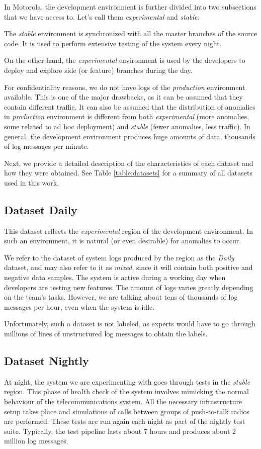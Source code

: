 In Motorola, the development environment is further divided into two subsections that we have access to. 
Let's call them \textit{experimental} and \textit{stable}. 

The \textit{stable} environment is synchronized with all the master branches of the source code. It is used to perform extensive testing of the system every night. 

On the other hand, the \textit{experimental} environment is used by the developers to deploy and explore side (or feature) branches during the day.

For confidentiality reasons, we do not have logs of the \textit{production} environment available. This is one of the major drawbacks, as it can be assumed that they contain different traffic. It can also be assumed that the distribution of anomalies in \textit{production} environment is different from both \textit{experimental} (more anomalies, some related to ad hoc deployment) and \textit{stable} (fewer anomalies, less traffic). In general, the development environment produces huge amounts of data, thousands of log messages per minute.

Next, we provide a detailed description of the characteristics of each dataset and how they were obtained. See Table \ref{table:datasets} for a summary of all datasets used in this work.

\subsection{Dataset Daily} 
This dataset reflects the \textit{experimental} region of the development environment. In such an environment, it is natural (or even desirable) for anomalies to occur.

We refer to the dataset of system logs produced by the region as the \textit{Daily} dataset, and may also refer to it as \textit{mixed}, since it will contain both positive and negative data samples. 
The system is active during a working day when developers are testing new features. The amount of logs varies greatly depending on the team's tasks. 
However, we are talking about tens of thousands of log messages per hour, even when the system is idle.

Unfortunately, such a dataset is not labeled, as experts would have to go through millions of lines of unstructured log messages to obtain the labels.

\subsection{Dataset Nightly}
At night, the system we are experimenting with goes through tests in the \textit{stable} region. This phase of health check of the system involves mimicking the normal behaviour of the telecommunications system. All the necessary infrastructure setup takes place and simulations of calls between groups of push-to-talk radios are performed. 
These tests are run again each night as part of the nightly test suite. 
Typically, the test pipeline lasts about 7 hours and produces about 2 million log messages.

